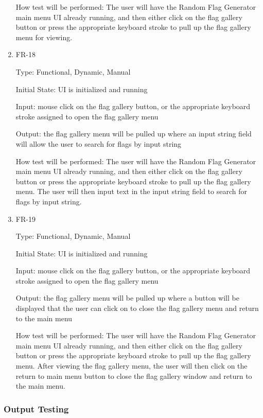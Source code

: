 \documentclass[12pt, titlepage]{article}
\begin{document}
\begin{enumerate}
How test will be performed: The user will have the Random Flag Generator main
menu UI already running, and then either click on the flag gallery button or
press the appropriate keyboard stroke to pull up the flag gallery menu for
viewing.

\item{FR-18\\}

Type: Functional, Dynamic, Manual

Initial State: UI is initialized and running

Input: mouse click on the flag gallery button, or the appropriate keyboard
stroke assigned to open the flag gallery menu

Output: the flag gallery menu will be pulled up where an input string field
will allow the user to search for flags by input string

How test will be performed: The user will have the Random Flag Generator main
menu UI already running, and then either click on the flag gallery button or
press the appropriate keyboard stroke to pull up the flag gallery menu. The
user will then input text in the input string field to search for flags by
input string.

\item{FR-19\\}

Type: Functional, Dynamic, Manual

Initial State: UI is initialized and running

Input: mouse click on the flag gallery button, or the appropriate keyboard
stroke assigned to open the flag gallery menu

Output: the flag gallery menu will be pulled up where a button will be
displayed that the user can click on to close the flag gallery menu and return
to the main menu

How test will be performed: The user will have the Random Flag Generator main
menu UI already running, and then either click on the flag gallery button or
press the appropriate keyboard stroke to pull up the flag gallery menu. After
viewing the flag gallery menu, the user will then click on the return to main
menu button to close the flag gallery window and return to the main menu.

\end{enumerate}

\subsubsection{Output Testing}
		
\end{document}
